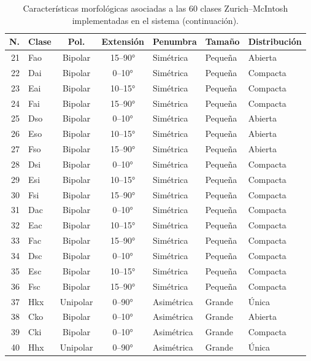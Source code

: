 \begin{appendices}
\begin{table}[H]
\centering
\caption*{Características morfológicas asociadas a las 60 clases Zurich--McIntosh implementadas en el sistema (continuación).}
\scriptsize
\setlength{\tabcolsep}{3pt}
\renewcommand{\arraystretch}{1.04}
\begin{tabular}{r l c c l l l}
\toprule
\textbf{N.} & \textbf{Clase} & \textbf{Pol.} & \textbf{Extensión} & \textbf{Penumbra} & \textbf{Tamaño} & \textbf{Distribución} \\
\midrule
21 & Fao & Bipolar & 15--90° & Simétrica & Pequeña & Abierta \\
22 & Dai & Bipolar & 0--10° & Simétrica & Pequeña & Compacta \\
23 & Eai & Bipolar & 10--15° & Simétrica & Pequeña & Compacta \\
24 & Fai & Bipolar & 15--90° & Simétrica & Pequeña & Compacta \\
25 & Dso & Bipolar & 0--10° & Simétrica & Pequeña & Abierta \\
26 & Eso & Bipolar & 10--15° & Simétrica & Pequeña & Abierta \\
27 & Fso & Bipolar & 15--90° & Simétrica & Pequeña & Abierta \\
28 & Dsi & Bipolar & 0--10° & Simétrica & Pequeña & Compacta \\
29 & Esi & Bipolar & 10--15° & Simétrica & Pequeña & Compacta \\
30 & Fsi & Bipolar & 15--90° & Simétrica & Pequeña & Compacta \\
31 & Dac & Bipolar & 0--10° & Simétrica & Pequeña & Compacta \\
32 & Eac & Bipolar & 10--15° & Simétrica & Pequeña & Compacta \\
33 & Fac & Bipolar & 15--90° & Simétrica & Pequeña & Compacta \\
34 & Dsc & Bipolar & 0--10° & Simétrica & Pequeña & Compacta \\
35 & Esc & Bipolar & 10--15° & Simétrica & Pequeña & Compacta \\
36 & Fsc & Bipolar & 15--90° & Simétrica & Pequeña & Compacta \\
37 & Hkx & Unipolar & 0--90° & Asimétrica & Grande & Única \\
38 & Cko & Bipolar & 0--10° & Asimétrica & Grande & Abierta \\
39 & Cki & Bipolar & 0--10° & Asimétrica & Grande & Compacta \\
40 & Hhx & Unipolar & 0--90° & Asimétrica & Grande & Única \\
\bottomrule
\end{tabular}
\end{table}


\end{appendices}
